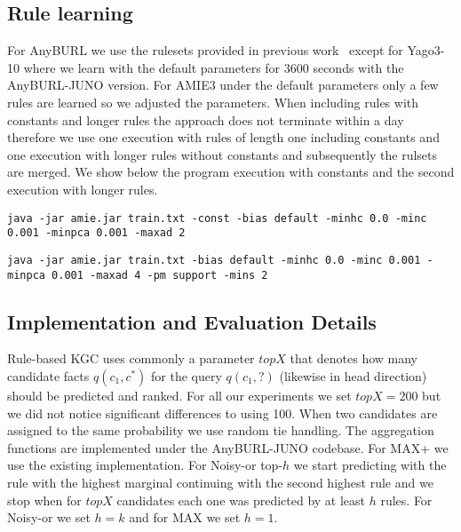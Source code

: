 \documentclass{article}
\theoremstyle{plain}
\theoremstyle{remark}
\begin{document}
{\begin{table}[h]
    \def\arraystretch{1.0}
    \centering
     \caption{Number of rules learned}
     \label{table: numLearnedRules}
\end{table}


\subsection{Rule learning}
For AnyBURL we use the rulesets provided in previous work~\cite{meilicke2021naive} except for Yago3-10 where we learn with the default parameters for 3600 seconds with the AnyBURL-JUNO version. For AMIE3 under the default parameters only a few rules are learned so we adjusted the parameters. When including rules with constants and longer rules the approach does not terminate within a day therefore we use one execution with rules of length one including constants and one execution with longer rules without constants and subsequently the rulsets are merged. We show below the program execution with constants and the second execution with longer rules.  
\begin{lstlisting}[breaklines]
   java -jar amie.jar train.txt -const -bias default -minhc 0.0 -minc 0.001 -minpca 0.001 -maxad 2
\end{lstlisting}

\begin{lstlisting}[breaklines]
    java -jar amie.jar train.txt -bias default -minhc 0.0 -minc 0.001 -minpca 0.001 -maxad 4 -pm support -mins 2
\end{lstlisting}

\subsection{Implementation and Evaluation Details}
Rule-based KGC uses commonly a parameter $topX$ that denotes how many candidate facts $q(c_1, c^*)$ for the query  $q(c_1,  ?)$ (likewise in head direction) should be predicted and ranked. For all our experiments we set $topX{=}200$ but we did not notice significant differences to using 100. When two candidates are assigned to the same probability we use random tie handling. The aggregation functions are implemented under the AnyBURL-JUNO codebase. For MAX+ we use the existing implementation. For Noisy-or top-$h$ we start predicting with the rule with the highest marginal continuing with the second highest rule and we stop when for $topX$ candidates each one was predicted by at least $h$ rules. For Noisy-or we set $h=k$ and for MAX we set $h=1$.


}
\end{document}
